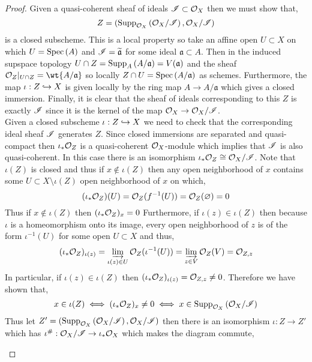 \documentclass[12pt]{article}
\begin{document}
\begin{proof}
Given a quasi-coherent sheaf of ideals $\mathscr{I} \subset \mathcal{O}_{X}$ then we must show that,
\[ Z = (\mathrm{Supp}_{\mathcal{O}_{X}}\left(\mathcal{O}_{X} / \mathscr{I} \right), \mathcal{O}_{X} / \mathscr{I}) \]
is a closed subscheme. This is a local property so take an affine open $U \subset X$ on which $U = \mathrm{Spec}\left( A \right)$ and $\mathscr{I} = \widetilde{\mathfrak{a}}$ for some ideal $\mathfrak{a} \subset A$. Then in the induced supspace topology $U \cap Z = \mathrm{Supp}_{A}\left(A / \mathfrak{a} \right) = V(\mathfrak{a})$ and the sheaf $\struct{Z} |_{U \cap Z} = \wt{A / \mathfrak{a}}$ so locally $Z \cap U = \mathrm{Spec}\left( A / \mathfrak{a} \right)$ as schemes. Furthermore, the map $\iota : Z \hookrightarrow X$ is given locally by the ring map $A \to A / \mathfrak{a}$ which gives a closed immersion. Finally, it is clear that the sheaf of ideals corresponding to this $Z$ is exactly $\mathscr{I}$ since it is the kernel of the map $\mathcal{O}_{X} \to \mathcal{O}_{X} / \mathscr{I}$. 
\bigskip\\
Given a closed subscheme $\iota : Z \hookrightarrow X$ we need to check that the corresponding ideal sheaf $\mathscr{I}$ generates $Z$. Since closed immersions are separated and quasi-compact then $\iota_* \mathcal{O}_{Z}$ is a quasi-coherent $\mathcal{O}_{X}$-module which implies that $\mathscr{I}$ is also quasi-coherent. In this case there is an isomorphism $\iota_* \mathcal{O}_{Z} \cong  \mathcal{O}_{X} / \mathscr{I}$. Note that $\iota(Z)$ is closed and thus if $x \notin \iota(Z)$ then any open neighborhood of $x$ contains some $U \subset X \setminus \iota(Z)$ open neighborhood of $x$ on which,
\[ (\iota_* \mathcal{O}_{Z})(U) = \mathcal{O}_{Z}(f^{-1}(U)) = \mathcal{O}_{Z}(\varnothing) = 0 \]
Thus if $x \notin \iota(Z)$ then $(\iota_* \mathcal{O}_{Z})_x = 0$ Furthermore, if $\iota(z) \in \iota(Z)$ then because $\iota$ is a homeomorphism onto its image, every open neighborhood of $z$ is of the form $\iota^{-1}(U)$ for some open $U \subset X$ and thus,
\[ (\iota_* \mathcal{O}_{Z})_{\iota(z)} = \varinjlim_{\iota(z) \in U} \mathcal{O}_{Z}(\iota^{-1}(U)) = \varinjlim_{z \in V} \mathcal{O}_{Z}(V) = \mathcal{O}_{Z, z}  \] 
In particular, if $\iota(z) \in \iota(Z)$ then $(\iota_* \mathcal{O}_{Z})_{\iota(z)} = \mathcal{O}_{Z, z} \neq 0$. Therefore we have shown that,
\[ x \in \iota(Z) \iff (\iota_* \mathcal{O}_{Z})_x \neq 0 \iff x \in \mathrm{Supp}_{\mathcal{O}_{X}}\left(\mathcal{O}_{X} / \mathscr{I} \right) \]
Thus let $Z' = (\mathrm{Supp}_{\mathcal{O}_{X}}\left(\mathcal{O}_{X} / \mathscr{I} \right), \mathcal{O}_{X} / \mathscr{I})$ then there is an isomorphism $\iota : Z \to Z'$ which has $\iota^\# : \mathcal{O}_{X} / \mathscr{I} \to \iota_* \mathcal{O}_{X}$ which makes the diagram commute,
\begin{center}
\end{center} 
\end{proof}
\end{document}
